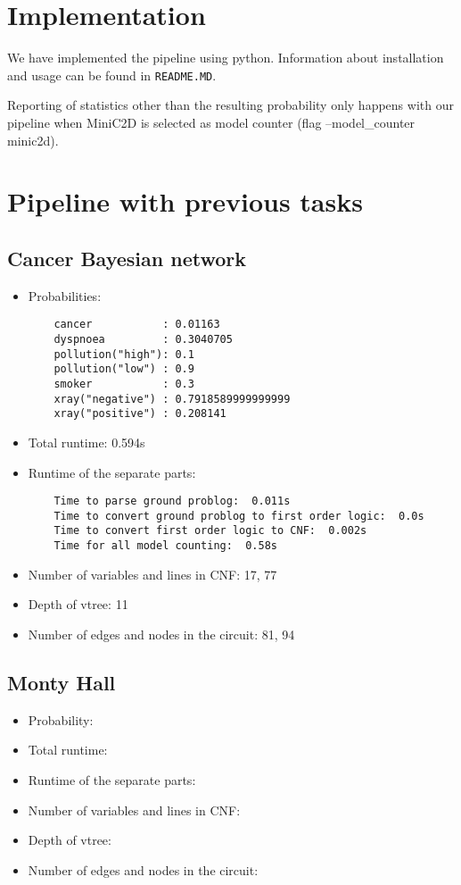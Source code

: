\section{Implementation}
We have implemented the pipeline using python. Information about installation and usage can be found in \texttt{README.MD}.

Reporting of statistics other than the resulting probability only happens with our pipeline when MiniC2D is selected as model counter (flag --model\_counter minic2d).

\section{Pipeline with previous tasks}
\subsection{Cancer Bayesian network}
\begin{itemize}
    \item Probabilities:
    \begin{lstlisting}
    cancer           : 0.01163
    dyspnoea         : 0.3040705
    pollution("high"): 0.1
    pollution("low") : 0.9
    smoker           : 0.3
    xray("negative") : 0.7918589999999999
    xray("positive") : 0.208141
    \end{lstlisting}
    \item Total runtime: 0.594s
    \item Runtime of the separate parts:
    \begin{lstlisting}
    Time to parse ground problog:  0.011s
    Time to convert ground problog to first order logic:  0.0s
    Time to convert first order logic to CNF:  0.002s
    Time for all model counting:  0.58s
    \end{lstlisting}
    \item Number of variables and lines in CNF: 17, 77
    \item Depth of vtree: 11
    \item Number of edges and nodes in the circuit: 81, 94
\end{itemize}
\subsection{Monty Hall}
\begin{itemize}
    \item Probability:
    \item Total runtime:
    \item Runtime of the separate parts:
    \item Number of variables and lines in CNF:
    \item Depth of vtree:
    \item Number of edges and nodes in the circuit:
\end{itemize}

